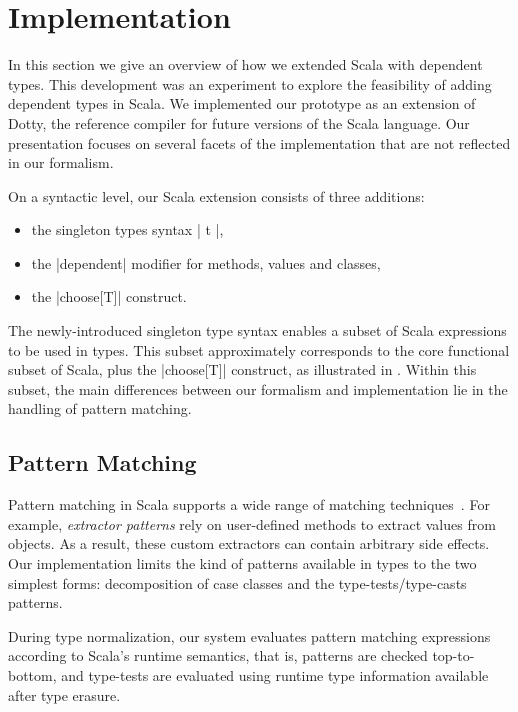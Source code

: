 \section{Implementation}
\label{sec:extending-scala}

In this section we give an overview of how we extended Scala with dependent types.
This development was an experiment to explore the feasibility of adding dependent types in Scala.
We implemented our prototype as an extension of Dotty, the reference compiler for future versions of the Scala language.
Our presentation focuses on several facets of the implementation that are not reflected in our formalism.

On a syntactic level, our Scala extension consists of three additions:

\begin{itemize}
\item
  the singleton types syntax |{ t }|,
\item
  the |dependent| modifier for methods, values and classes,
\item
  the |choose[T]| construct.
\end{itemize}

\noindent
The newly-introduced singleton type syntax enables a subset of Scala expressions to be used in types.
This subset approximately corresponds to the core functional subset of Scala, plus the |choose[T]| construct, as illustrated in \oursystem.
Within this subset, the main differences between our formalism and implementation lie in the handling of pattern matching.

\subsection{Pattern Matching}
\label{pattern-matching}

Pattern matching in Scala supports a wide range of matching techniques~\citep{emir2007matching}.
For example, \emph{extractor patterns} rely on user-defined methods to extract values from objects.
As a result, these custom extractors can contain arbitrary side effects.
Our implementation limits the kind of patterns available in types to the two simplest forms: decomposition of case classes and the type-tests/type-casts patterns.

During type normalization, our system evaluates pattern matching expressions according to Scala's runtime semantics, that is, patterns are checked top-to-bottom, and type-tests are evaluated using runtime type information available after type erasure.

